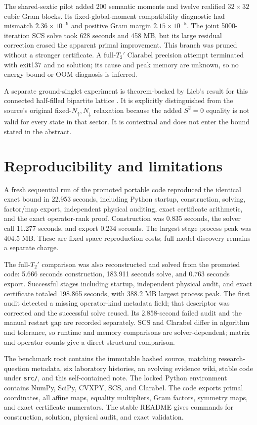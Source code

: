 \documentclass[11pt]{article}
\begin{document}
The shared-sextic pilot added 200 semantic moments and twelve realified $32\times32$ cubic Gram blocks. Its fixed-global-moment compatibility diagnostic had mismatch $2.36\times10^{-9}$ and positive Gram margin $2.15\times10^{-5}$. The joint 5000-iteration SCS solve took 628 seconds and 458 MB, but its large residual correction erased the apparent primal improvement. This branch was pruned without a stronger certificate. A full-$T_2\prime$ Clarabel precision attempt terminated with exit137 and no solution; its cause and peak memory are unknown, so no energy bound or OOM diagnosis is inferred.

A separate ground-singlet experiment is theorem-backed by Lieb's result for this connected half-filled bipartite lattice \cite{lieb}. It is explicitly distinguished from the source's original fixed-$N_\uparrow,N_\downarrow$ relaxation because the added $S^2=0$ equality is not valid for every state in that sector. It is contextual and does not enter the bound stated in the abstract.

\section{Reproducibility and limitations}
A fresh sequential run of the promoted portable code reproduced the identical exact bound in 22.953 seconds, including Python startup, construction, solving, factor/map export, independent physical auditing, exact certificate arithmetic, and the exact operator-rank proof. Construction was 0.835 seconds, the solver call 11.277 seconds, and export 0.234 seconds. The largest stage process peak was 404.5 MB. These are fixed-space reproduction costs; full-model discovery remains a separate charge.

The full-$T_2'$ comparison was also reconstructed and solved from the promoted code: 5.666 seconds construction, 183.911 seconds solve, and 0.763 seconds export. Successful stages including startup, independent physical audit, and exact certificate totaled 198.865 seconds, with 388.2 MB largest process peak. The first audit detected a missing operator-kind metadata field; that descriptor was corrected and the successful solve reused. Its 2.858-second failed audit and the manual restart gap are recorded separately. SCS and Clarabel differ in algorithm and tolerance, so runtime and memory comparisons are solver-dependent; matrix and operator counts give a direct structural comparison.

The benchmark root contains the immutable hashed source, matching research-question metadata, six laboratory histories, an evolving evidence wiki, stable code under \texttt{src/}, and this self-contained note. The locked Python environment contains NumPy, SciPy, CVXPY, SCS, and Clarabel. The code exports primal coordinates, all affine maps, equality multipliers, Gram factors, symmetry maps, and exact certificate numerators. The stable README gives commands for construction, solution, physical audit, and exact validation.
\end{document}
